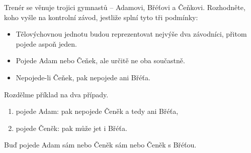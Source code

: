 \begin{example}[SMP 144/12]
  Trenér se věnuje trojici gymnastů -- Adamovi, Břéťovi a Čeňkovi. Rozhodněte, koho vyšle na kontrolní
závod, jestliže splní tyto tři podmínky:
\begin{itemize}
  \item Tělovýchovnou jednotu budou reprezentovat nejvýše dva závodníci, přitom pojede aspoň jeden.
  \item Pojede Adam nebo Čeňek, ale určitě ne oba součastně.
  \item Nepojede-li Čeňek, pak nepojede ani Břéťa.
\end{itemize}

\rm Rozdělme příklad na dva případy.
\begin{enumerate}[$i.$]
  \item pojede Adam: pak nepojede Čeněk a tedy ani Břéťa,
  \item pojede Čeněk: pak může jet i Břéťa.
\end{enumerate}

Buď pojede Adam sám nebo Čeněk sám nebo Čeněk s Břéťou.

\end{example}

